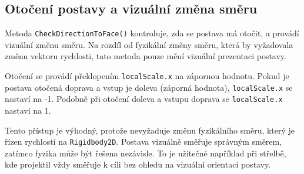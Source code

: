 \subsection{Otočení postavy a vizuální změna směru}

Metoda \texttt{CheckDirectionToFace()} kontroluje, zda se postava má otočit, a provádí vizuální změnu směru. Na rozdíl od fyzikální změny směru, která by vyžadovala změnu vektoru rychlosti, tato metoda pouze mění vizuální prezentaci postavy.

Otočení se provádí překlopením \texttt{localScale.x} na zápornou hodnotu. Pokud je postava otočená doprava a vstup je doleva (záporná hodnota), \texttt{localScale.x} se nastaví na -1. Podobně při otočení doleva a vstupu doprava se \texttt{localScale.x} nastaví na 1.

Tento přístup je výhodný, protože nevyžaduje změnu fyzikálního směru, který je řízen rychlostí na \texttt{Rigidbody2D}. Postava vizuálně směřuje správným směrem, zatímco fyzika může být řešena nezávisle. To je užitečné například při střelbě, kde projektil vždy směřuje k cíli bez ohledu na vizuální orientaci postavy.